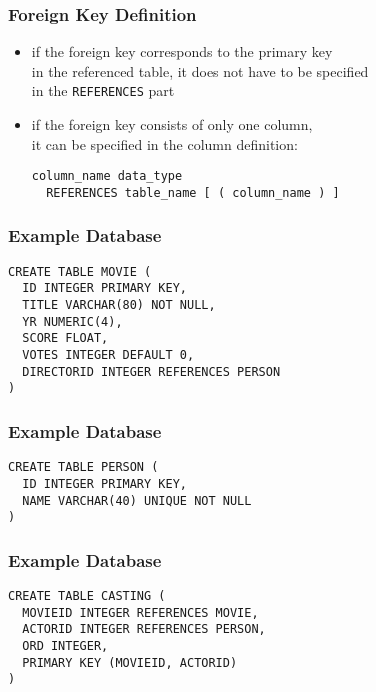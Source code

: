\documentclass[dvipsnames]{beamer}
\theoremstyle{plain}
\begin{document}
\begin{frame}[fragile]
  \frametitle{Foreign Key Definition}

  \begin{itemize}
    \item if the foreign key corresponds to the primary key\\
      in the referenced table, it does not have to be specified\\
      in the \texttt{REFERENCES} part

    \medskip
    \item if the foreign key consists of only one column,\\
      it can be specified in the column definition:
    \begin{lstlisting}
column_name data_type
  REFERENCES table_name [ ( column_name ) ]
    \end{lstlisting}
  \end{itemize}
\end{frame}

\begin{frame}[fragile]
  \frametitle{Example Database}

  \begin{example}
    \begin{lstlisting}
CREATE TABLE MOVIE (
  ID INTEGER PRIMARY KEY,
  TITLE VARCHAR(80) NOT NULL,
  YR NUMERIC(4),
  SCORE FLOAT,
  VOTES INTEGER DEFAULT 0,
  DIRECTORID INTEGER REFERENCES PERSON
)
    \end{lstlisting}
  \end{example}
\end{frame}

\begin{frame}[fragile]
  \frametitle{Example Database}

  \begin{example}
    \begin{lstlisting}
CREATE TABLE PERSON (
  ID INTEGER PRIMARY KEY,
  NAME VARCHAR(40) UNIQUE NOT NULL
)
    \end{lstlisting}
  \end{example}
\end{frame}

\begin{frame}[fragile]
  \frametitle{Example Database}

  \begin{example}
    \begin{lstlisting}
CREATE TABLE CASTING (
  MOVIEID INTEGER REFERENCES MOVIE,
  ACTORID INTEGER REFERENCES PERSON,
  ORD INTEGER,
  PRIMARY KEY (MOVIEID, ACTORID)
)
    \end{lstlisting}
  \end{example}
\end{frame}
\end{document}
